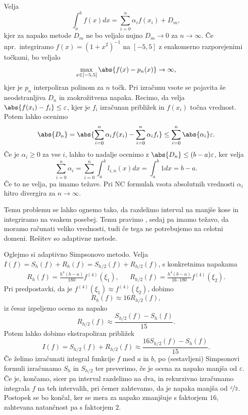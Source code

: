 

Velja
\[
  \int_a^b f(x) dx = \sum_{i=0}^n \alpha_i f(x_i) + D_m,
\]
kjer za napako metode $D_m$ ne bo veljalo nujno $D_m \to 0$ za $n \to \infty$.
Če npr.~integriramo $f(x) = (1+x^2)^{-1}$ na $[-5, 5]$ z enakomerno
razporejenimi točkami, bo veljalo
\[
  \max_{x \in [-5, 5]} \abs{f(x) - p_n(x)} \to \infty,
\]
kjer je $p_n$ interpoliran polinom za $n$ točk.
Pri izračunu vsote se pojavita še neodstranljiva $D_n$ in zaokrožitvena napaka.
Recimo, da velja $\abs{f(x_i) - f_i} \le \varepsilon$, kjer je $f_i$ izračunan
približek in $f(x_i)$ točna vrednost.
Potem lahko ocenimo
\[
  \abs{D_n}
  = \abs{\sum_{i=0}^n \alpha_i f(x_i) - \sum_{i=0}^n \alpha_i f_i}
  \le \sum_{i=0}^n \abs{\alpha_i} \varepsilon.
\]
Če je $\alpha_i \ge 0$ za vse $i$, lahko to nadalje ocenimo z $\abs{D_n} \le
(b-a)\varepsilon$, ker velja
\[
  \sum_{i=0}^n \alpha_i
  = \sum_{i=0}^n \int_a^b l_{i,n}(x) dx
  = \int_a^b 1 dx
  = b-a.
\]
Če to ne velja, pa imamo težave.
Pri NC formulah vsota absolutnih vrednosti $\alpha_i$ hitro divergira za $n \to
\infty$.


Temu problemu se lahko ognemo tako, da razdelimo interval na manjše kose in
integriramo na vsakem posebej.
Temu pravimo , sedaj pa imamo težavo, da moramo
računati veliko vrednosti, tudi če tega ne potrebujemo na celotni domeni.
Rešitev so adaptivne metode.

Oglejmo si adaptivno Simpsonovo metodo.
Velja $I(f) = S_h(f) + R_h(f) = S_{h/2}(f) + R_{h/2}(f)$, s konkretnima napakama
\begin{align*}
  R_h(f) = \frac{h^4 (b-a)}{180} f^{(4)}(\xi_1),
  && R_{h/2}(f) = \frac{h^4 (b-a)}{16 \cdot 180} f^{(4)}(\xi_2).
\end{align*}
Pri predpostavki, da je $f^{(4)}(\xi_1) \approx f^{(4)}(\xi_2)$, dobimo
\[
  R_h(f) \approx 16 R_{h/2}(f),
\]
iz česar izpeljemo oceno za napako
\[
  R_{h/2}(f) \approx \frac{S_{h/2}(f) - S_h(f)}{15}.
\]
Potem lahko dobimo ekstrapoliran približek
\[
  I(f) = S_{h/2}(f) + R_{h/2}(f) \approx \frac{16 S_{h/2}(f) - S_h(f)}{15}.
\]
Če želimo izračunati integral funkcije $f$ med $a$ in $b$, po (sestavljeni)
Simpsonovi formuli izračunamo $S_h$ in $S_{h/2}$ ter preverimo, če je ocena za
napako manjša od $\varepsilon$.
Če je, končamo, sicer pa interval razdelimo na dva, in rekurzivno izračunamo
integrala $f$ na teh intervalih, pri čemer zahtevamo, da je napaka manjša od
$\nicefrac{\varepsilon}{2}$.
Postopek se bo končal, ker se mera za napako zmanjšuje s faktorjem $16$,
zahtevana natančnost pa s faktorjem $2$.

